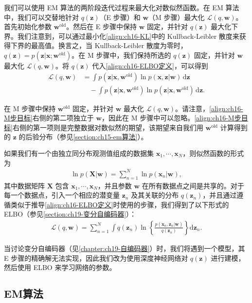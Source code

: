 \documentclass[../../main.tex]{subfiles}
\begin{document}
我们可以使用 EM 算法的两阶段迭代过程来最大化对数似然函数。在 EM 算法中，我们可以交替地针对 $q(\bm{z})$（E 步骤）和 $\bm{w}$（M 步骤）最大化 $\mathcal{L}(q,\bm{w})$。首先初始化参数 $\bm{w}^{\text{old}}$。然后在 E 步骤中保持 $\bm{w}$ 固定，并针对 $q(\bm{z})$ 最大化下界。我们注意到，可以通过最小化\eqref{align:ch16-KL}中的 Kullback-Leibler 散度来获得下界的最高值。换言之，当 Kullback-Leibler 散度为零时，$q(\bm{z})=p(\bm{z}|\bm{x};\bm{w}^{\text{old}})$。在 M 步骤中，我们保持所选的 $q(\bm{z})$ 固定，并针对 $\bm{w}$ 最大化 $\mathcal{L}(q,\bm{w})$。将 $q(\bm{z})$ 代入\eqref{align:ch16-ELBO定义}，可以得到
\begin{align}
  \mathcal{L}(q,\bm{w})&=\int p(\bm{z}|\bm{x},\bm{w}^{\text{old}})\ln p(\bm{x},\bm{z}|\bm{w})\,\mathrm{d}\bm{z}\nonumber\\
  &\quad-\int p(\bm{z}|\bm{x},\bm{w}^{\text{old}})\ln p(\bm{z}|\bm{x},\bm{w}^{\text{old}})\,\mathrm{d}\bm{z}.
  \label{align:ch16-M步目标}
\end{align}

在 M 步骤中保持 $\bm{w}^{\text{old}}$ 固定，并针对 $\bm{w}$ 最大化 $\mathcal{L}(q,\bm{w})$。请注意，\eqref{align:ch16-M步目标}右侧的第二项独立于 $\bm{w}$，因此在 M 步骤中可以忽略。\eqref{align:ch16-M步目标}右侧的第一项则是完整数据对数似然的期望，该期望来自我们用 $\bm{w}^{\text{old}}$ 计算得到的 $\bm{z}$ 的后验分布（参见\cref{section:ch15-em算法}）。

如果我们有一个由独立同分布观测值组成的数据集 $\bm{x}_1,\cdots,\bm{x}_N$，则似然函数的形式为
\begin{align}
  \ln p(\bm{X}|\bm{w})=\sum_{n=1}^{N}\ln p(\bm{x}_n|\bm{w}),
  \label{align:ch16-iid似然}
\end{align}
其中数据矩阵 $\bm{X}$ 包含 $\bm{x}_1,\cdots,\bm{x}_N$，并且参数 $\bm{w}$ 在所有数据点之间是共享的。对于每一个数据点，引入一个相应的潜变量 $\bm{z}_n$ 及其关联的分布 $q(\bm{z}_n)$，并且通过遵循类似于推导\eqref{align:ch16-ELBO定义}时使用的步骤，我们得到了以下形式的 ELBO（参见\cref{section:ch19-变分自编码器}）：
\begin{align}
  \mathcal{L}(q,\bm{w})=\sum_{n=1}^{N}\int q(\bm{z}_n)\ln\!\left\{\frac{p(\bm{x}_n,\bm{z}_n|\bm{w})}{q(\bm{z}_n)}\right\}\mathrm{d}\bm{z}_n.
  \label{align:ch16-ELBO-iid}
\end{align}

当讨论变分自编码器（见\cref{chapter:ch19-自编码器}）时，我们将遇到一个模型，其 E 步骤的精确解无法实现，因此我们改为使用深度神经网络对 $q(\bm{z})$ 进行建模，然后使用 ELBO 来学习网络的参数。

\subsection{EM算法}\label{subsection:ch16-EM算法}
\end{document}
